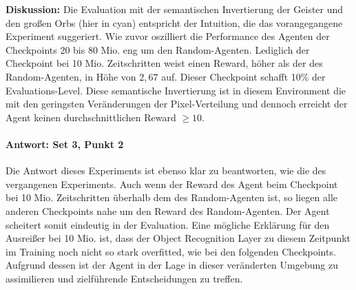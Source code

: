 \textbf{Diskussion:} Die Evaluation mit der semantischen Invertierung der Geister und den großen Orbs (hier in cyan) entspricht der Intuition, die das vorangegangene Experiment suggeriert. Wie zuvor oszilliert die Performance des Agenten der Checkpoints 20 bis 80 Mio. eng um den Random-Agenten. Lediglich der Checkpoint bei 10 Mio. Zeitschritten weist einen Reward, höher als der des Random-Agenten, in Höhe von $2,67$ auf. Dieser Checkpoint schafft 10\% der Evaluations-Level. Diese semantische Invertierung ist in diesem Environment die mit den geringsten Veränderungen der Pixel-Verteilung und dennoch erreicht der Agent keinen durchschnittlichen Reward $\geq 10$.

\paragraph{Antwort: Set 3, Punkt 2}
Die Antwort dieses Experiments ist ebenso klar zu beantworten, wie die des vergangenen Experiments. Auch wenn der Reward des Agent beim Checkpoint bei 10 Mio. Zeitschritten überhalb dem des Random-Agenten ist, so liegen alle anderen Checkpoints nahe um den Reward des Random-Agenten. Der Agent scheitert somit eindeutig in der Evaluation. Eine mögliche Erklärung für den Ausreißer bei 10 Mio. ist, dass der Object Recognition Layer zu diesem Zeitpunkt im Training noch nicht so stark overfitted, wie bei den folgenden Checkpoints. Aufgrund dessen ist der Agent in der Lage in dieser veränderten Umgebung zu assimilieren und zielführende Entscheidungen zu treffen. 
















\newpage












